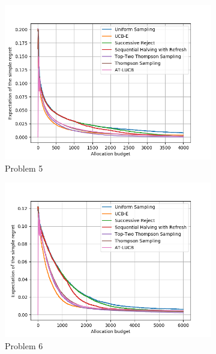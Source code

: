 \documentclass[twoside,11pt]{article}
\begin{document}
\begin{figure}[ht]
\begin{subfigure}[t]{0.2\textwidth}
    \centering\includegraphics[width=\textwidth]{img/bai/setting5.png}
    \caption{Problem 5}
  \end{subfigure}
  \begin{subfigure}[t]{0.2\textwidth}
    \centering\includegraphics[width=\textwidth]{img/bai/setting6.png}
    \caption{Problem 6}
  \end{subfigure}
  \begin{subfigure}[t]{0.2\textwidth}

\end{subfigure}
\end{figure}
\end{document}
